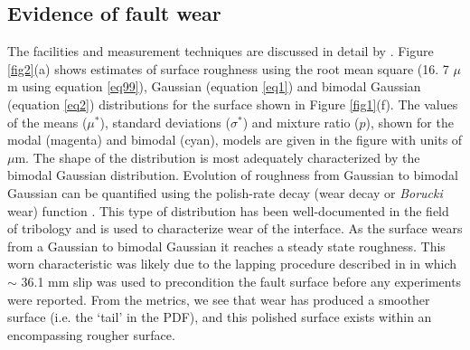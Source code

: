 \documentclass[preprint,1p, 10pt,authoryear]{elsarticle}
\begin{document}
\subsection{Evidence of fault wear}
\label{SurfaceWear}
The facilities and measurement techniques are discussed in detail by \citet{Selvadurai2017}.  Figure \ref{fig2}(a) shows estimates of surface roughness using the root mean square (16. 7 $\mu$m using equation \eqref{eq99}), Gaussian (equation \eqref{eq1}) and bimodal Gaussian (equation \eqref{eq2}) distributions for the surface shown in Figure \ref{fig1}(f). The values of the means ($\mu^{*}$), standard deviations ($\sigma^{*}$) and mixture ratio ($p$), shown for the modal (magenta) and bimodal (cyan), models are given in the figure with units of $\mu$m.  The shape of the distribution is most adequately characterized by the bimodal Gaussian distribution.  Evolution of roughness from Gaussian to bimodal Gaussian can be quantified using the polish-rate decay (wear decay or \textit{Borucki} wear) function \citep{Adachi2000, Borucki2002, Borucki2004, Ciavarella2016,He2017,Hu2019}. This type of distribution has been well-documented in the field of tribology and is used to characterize wear of the interface. As the surface wears from a Gaussian to bimodal Gaussian it reaches a steady state roughness.  This worn characteristic was likely due to the lapping procedure described in \citet{Selvadurai2015} in which  $\sim$ 36.1 mm slip was used to precondition the fault surface before any experiments were reported. From the metrics, we see that wear has produced a smoother surface (i.e.  the `tail' in the PDF), and this polished surface exists within an encompassing rougher surface.     
\end{document}
